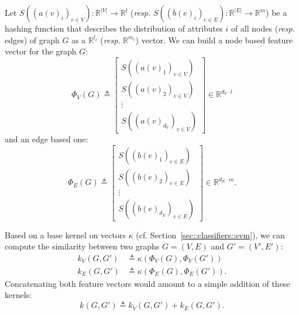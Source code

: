             Let $S\left(\left(a(v)_i\right)_{v\in V}\right): \mathbb{R}^{\vert V\vert} \rightarrow \mathbb{R}^l$ (\textit{resp.} $S\left(\left(b(e)_i\right)_{e\in E}\right): \mathbb{R}^{\vert E\vert} \rightarrow \mathbb{R}^{m}$) be a hashing function that describes the distribution of attributes $i$ of all nodes (\textit{resp.} edges) of graph $G$ as a $\mathbb{R}^{l_i}$ (\textit{resp.} $\mathbb{R}^{m_i}$) vector.
            We can build a node based feature vector for the graph $G$:
            \begin{equation}
                \label{eq::feature_node_graph}
                \Phi_V(G) \triangleq \begin{bmatrix}
                    S\left(\left(a(v)_1\right)_{v\in V}\right)\\
                    S\left(\left(a(v)_2\right)_{v\in V}\right)\\
                    \vdots\\
                    S\left(\left(a(v)_{d_V}\right)_{v\in V}\right)
                \end{bmatrix} \in \mathbb{R}^{d_V \cdot l}
            \end{equation}
            and an edge based one:
            \begin{equation}
                \label{eq::feature_edge_graph}
                \Phi_E(G) \triangleq \begin{bmatrix}
                    S\left(\left(b(e)_1\right)_{e \in E}\right)\\
                    S\left(\left(b(e)_2\right)_{e \in E}\right)\\
                    \vdots\\
                    S\left(\left(b(e)_{d_E}\right)_{e \in E}\right)
                \end{bmatrix} \in \mathbb{R}^{d_E \cdot m}.
            \end{equation}

            Based on a base kernel on vectors $\kappa$ (cf. Section~\ref{sec::classifiers::svm}), we can compute the similarity between two graphs $G = \left(V, E\right)$ and $G' = \left(V', E'\right)$:
            \begin{align}
                \label{eq::feature_graph_kernel_nodes}
                k_V(G, G') &\triangleq \kappa(\Phi_V(G), \Phi_V(G'))\\
                \label{eq::feature_graph_kernel_edges}
                k_E(G, G') &\triangleq \kappa(\Phi_E(G), \Phi_E(G')).
            \end{align}
            Concatenating both feature vectors would amount to a simple addition of these kernels:
            \begin{equation}
                \label{eq::feature_graph_kernel_sum}
                k(G, G') \triangleq k_V(G, G') + k_E(G, G').
            \end{equation}

